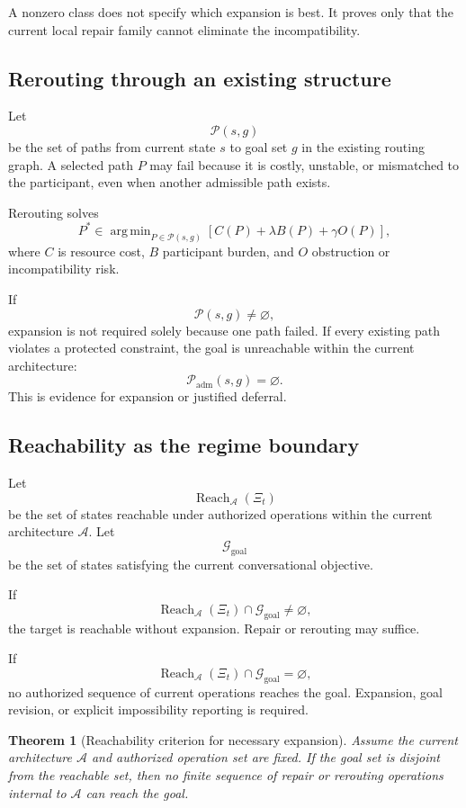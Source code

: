 \documentclass[11pt]{article}
\newtheorem{theorem}[definition]{Theorem}
\theoremstyle{definition}
\DeclareMathOperator{\argmin}{arg\,min}
\DeclareMathOperator{\Reach}{Reach}
\begin{document}
A nonzero class does not specify which expansion is best. It proves only that the current local repair family cannot eliminate the incompatibility.

\subsection{Rerouting through an existing structure}

Let
\[
\mathcal P(s,g)
\]
be the set of paths from current state \(s\) to goal set \(g\) in the existing routing graph. A selected path \(P\) may fail because it is costly, unstable, or mismatched to the participant, even when another admissible path exists.

Rerouting solves
\[
P^{*}
\in
\argmin_{P\in\mathcal P(s,g)}
\left[
C(P)
+
\lambda B(P)
+
\gamma O(P)
\right],
\]
where \(C\) is resource cost, \(B\) participant burden, and \(O\) obstruction or incompatibility risk.

If
\[
\mathcal P(s,g)\neq\varnothing,
\]
expansion is not required solely because one path failed. If every existing path violates a protected constraint, the goal is unreachable within the current architecture:
\[
\mathcal P_{\mathrm{adm}}(s,g)
=
\varnothing.
\]
This is evidence for expansion or justified deferral.

\subsection{Reachability as the regime boundary}

Let
\[
\Reach_{\mathcal A}(\Xi_t)
\]
be the set of states reachable under authorized operations within the current architecture \(\mathcal A\). Let
\[
\mathcal G_{\mathrm{goal}}
\]
be the set of states satisfying the current conversational objective.

If
\[
\Reach_{\mathcal A}(\Xi_t)
\cap
\mathcal G_{\mathrm{goal}}
\neq
\varnothing,
\]
the target is reachable without expansion. Repair or rerouting may suffice.

If
\[
\Reach_{\mathcal A}(\Xi_t)
\cap
\mathcal G_{\mathrm{goal}}
=
\varnothing,
\]
no authorized sequence of current operations reaches the goal. Expansion, goal revision, or explicit impossibility reporting is required.

\begin{theorem}[Reachability criterion for necessary expansion]
Assume the current architecture \(\mathcal A\) and authorized operation set are fixed. If the goal set is disjoint from the reachable set, then no finite sequence of repair or rerouting operations internal to \(\mathcal A\) can reach the goal.
\end{theorem}
\end{document}
